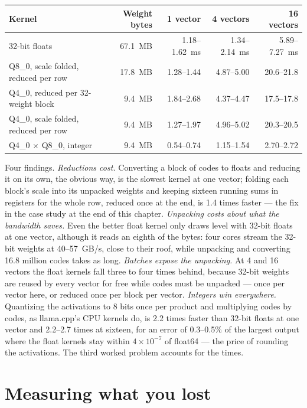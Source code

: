 \begin{center}\small
\begin{tabular}{@{}lrrrr@{}}
\toprule
Kernel & Weight bytes & 1 vector & 4 vectors & 16 vectors \\
\midrule
32-bit floats & 67.1~MB & 1.18--1.62~ms & 1.34--2.14~ms & 5.89--7.27~ms \\
Q8\_0, scale folded, reduced per row & 17.8~MB & 1.28--1.44 & 4.87--5.00 & 20.6--21.8 \\
Q4\_0, reduced per 32-weight block & 9.4~MB & 1.84--2.68 & 4.37--4.47 & 17.5--17.8 \\
Q4\_0, scale folded, reduced per row & 9.4~MB & 1.27--1.97 & 4.96--5.02 & 20.3--20.5 \\
Q4\_0 $\times$ Q8\_0, integer & 9.4~MB & 0.54--0.74 & 1.15--1.54 & 2.70--2.72 \\
\bottomrule
\end{tabular}
\end{center}

\noindent Four findings. \emph{Reductions cost.} Converting a block of codes to
floats and reducing it on its own, the obvious way, is the slowest kernel at one
vector; folding each block's scale into its unpacked weights and keeping sixteen
running sums in registers for the whole row, reduced once at the end, is 1.4
times faster --- the fix in the case study at the end of this chapter.
\emph{Unpacking costs about what the bandwidth saves.} Even the better float
kernel only draws level with 32-bit floats at one vector, although it reads an
eighth of the bytes: four cores stream the 32-bit weights at 40--57~GB/s, close
to their roof, while unpacking and converting 16.8 million codes takes as long.
\emph{Batches expose the unpacking.} At 4 and 16 vectors the float kernels fall
three to four times behind, because 32-bit weights are reused by every vector
for free while codes must be unpacked --- once per vector here, or reduced once
per block per vector. \emph{Integers win everywhere.} Quantizing the activations
to 8 bits once per product and multiplying codes by codes, as llama.cpp's CPU
kernels do, is 2.2 times faster than 32-bit floats at one vector and 2.2--2.7
times at sixteen, for an error of 0.3--0.5\% of the largest output where the
float kernels stay within $4\times10^{-7}$ of float64 --- the price of rounding
the activations. The third worked problem accounts for the times.


\section{Measuring what you lost}

